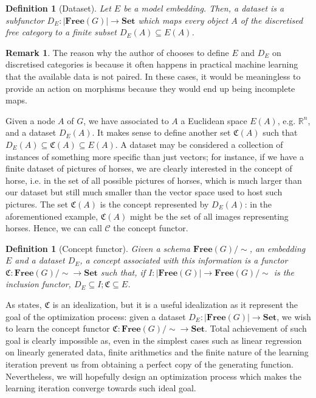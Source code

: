 \documentclass[11pt,a4paper,openright,twoside]{report}
\theoremstyle{plain}
\newtheorem{definition}[proposition]{Definition}
\theoremstyle{definition}
\newtheorem{remark}[proposition]{Remark}
\begin{document}
\begin{definition}[Dataset]
  Let $E$ be a model embedding. Then, a dataset is a subfunctor $D_E: |\mathbf{Free}(G)| \to \mathbf{Set}$ which maps every object $A$ of the discretised free category to a finite subset $D_E(A) \subseteq E(A)$.
\end{definition}

\begin{remark}
  The reason why the author of \cite{gavranovicLearningFunctorsUsing2020} chooses to define $E$ and $D_E$ on discretised categories is because it often happens in practical machine learning that the available data is not paired. In these cases, it would be meaningless to provide an action on morphisms because they would end up being incomplete maps.
\end{remark}

Given a node $A$ of $G$, we have associated to $A$ a Euclidean space $E(A)$, e.g. $\mathbb{R}^n$, and a dataset $D_E(A)$. It makes sense to define another set $\mathfrak{C}(A)$ such that $D_E(A) \subseteq \mathfrak{C}(A) \subseteq E(A)$. A dataset may be considered a collection of instances of something more specific than just vectors; for instance, if we have a finite dataset of pictures of horses, we are clearly interested in the concept of horse, i.e. in the set of all possible pictures of horses, which is much larger than our dataset but still much smaller than the vector space used to host such pictures. The set $\mathfrak{C}(A)$ is the concept represented by $D_E(A)$: in the aforementioned example, $\mathfrak{C}(A)$ might be the set of all images representing horses. Hence, we can call $\mathcal{C}$ the concept functor. 

\begin{definition}[Concept functor]
  Given a schema $\mathbf{Free}(G)/{\sim}$, an embedding $E$ and a dataset $D_E$, a concept associated with this information is a functor $\mathfrak{C}: \mathbf{Free}(G)/{\sim} \to \mathbf{Set}$ such that, if $I: |\mathbf{Free}(G)| \to \mathbf{Free}(G)/{\sim}$ is the inclusion functor, $D_E \subseteq I;\mathfrak{C} \subseteq E$.
\end{definition}

As \cite{gavranovicLearningFunctorsUsing2020} states, $\mathfrak{C}$ is an idealization, but it is a useful idealization as it represent the goal of the optimization process: given a dataset $D_E: |\mathbf{Free}(G)| \to \mathbf{Set}$, we wish to learn the concept functor $\mathfrak{C}: \mathbf{Free}(G)/{\sim} \to \mathbf{Set}$. Total achievement of such goal is clearly impossible as, even in the simplest cases such as linear regression on linearly generated data, finite arithmetics and the finite nature of the learning iteration prevent us from obtaining a perfect copy of the generating function.
Nevertheless, we will hopefully design an optimization process which makes the learning iteration converge towards such ideal goal.
\end{document}
